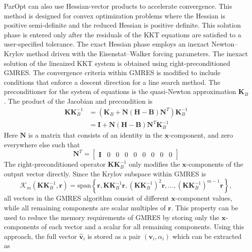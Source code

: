 \documentclass[12pt]{article}
\newcommand{\mb}{\mathbf}
\begin{document}
ParOpt can also use Hessian-vector products to accelerate convergence.
This method is designed for convex optimization problems where the Hessian is positive semi-definite and the reduced Hessian is positive definite.
This solution phase is entered only after the residuals of the KKT equations are satisfied to a user-specified tolerance.
The exact Hessian phase employs an inexact Newton--Krylov method driven with the Eisenstat--Walker forcing parameters.
The inexact solution of the lineaized KKT system is obtained using right-preconditioned GMRES.
The convergence criteria within GMRES is modified to include conditions that enforce a descent direction for a line search method.
The preconditioner for the system of equations is the quasi-Newton approximation $\mb{K}_{B}$.
The product of the Jacobian and precondition is
%
\begin{equation}
  \begin{aligned}
    \mb{K}\mb{K}_{B}^{-1} & = \left(\mb{K}_{B} + 
    \mb{N}\left(\mb{H} - \mb{B}\right)\mb{N}^{T}\right)\mb{K}_{B}^{-1} \\
    & = \mb{I} + \mb{N} \left(\mb{H} - \mb{B} \right) \mb{N}^{T} \mb{K}_{B}^{-1}
  \end{aligned}
\end{equation}
Here $\mb{N}$ is a matrix that consists of an identity in the $\mb{x}$-component, and zero everywhere else such that
%
\begin{equation*}
  \mb{N}^{T} = \begin{bmatrix} \mb{I} & 0 & 0 & 0 & 0 & 0 & 0 & 0 & 0 \end{bmatrix}
\end{equation*}
The right-preconditioned operator $\mb{K}\mb{K}_{B}^{-1}$ only modifies the $\mb{x}$-components of the output vector directly. 
Since the Krylov subspace within GMRES is
\begin{equation*}
  \mathcal{K}_{m}(\mb{K}\mb{K}_{B}^{-1}, \mb{r}) = \text{span} \left\{\mb{r}, \mb{K}\mb{K}_{B}^{-1}\mb{r}, \left(\mb{K}\mb{K}_{B}^{-1}\right)^{2} \mb{r}, \ldots, \left(\mb{K}\mb{K}_{B}^{-1}\right)^{m-1} \mb{r} \right\},
\end{equation*} 
all vectors in the GMRES algorithm consist of different $\mb{x}$-component values, while all remaining components are scalar multiples of $\mb{r}$. 
This property can be used to reduce the memory requirements of GMRES by storing only the $\mb{x}$-components of each vector and a scalar for all remaining components.
Using this approach, the full vector $\hat{\mb{v}}_{i}$ is stored as a pair $(\mb{v}_{i}, \alpha_{i})$ which can be extracted as
\end{document}
